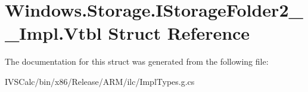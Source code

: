 \hypertarget{struct_windows_1_1_storage_1_1_i_storage_folder2_____impl_1_1_vtbl}{}\section{Windows.\+Storage.\+I\+Storage\+Folder2\+\_\+\+\_\+\+Impl.\+Vtbl Struct Reference}
\label{struct_windows_1_1_storage_1_1_i_storage_folder2_____impl_1_1_vtbl}


The documentation for this struct was generated from the following file\+:\begin{DoxyCompactItemize}
\item 
I\+V\+S\+Calc/bin/x86/\+Release/\+A\+R\+M/ilc/Impl\+Types.\+g.\+cs\end{DoxyCompactItemize}
